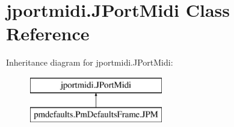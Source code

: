 \hypertarget{classjportmidi_1_1_j_port_midi}{}\section{jportmidi.\+J\+Port\+Midi Class Reference}
\label{classjportmidi_1_1_j_port_midi}
Inheritance diagram for jportmidi.\+J\+Port\+Midi\+:\begin{figure}[H]
\begin{center}
\leavevmode
\includegraphics[height=2.000000cm]{classjportmidi_1_1_j_port_midi}
\end{center}
\end{figure}
